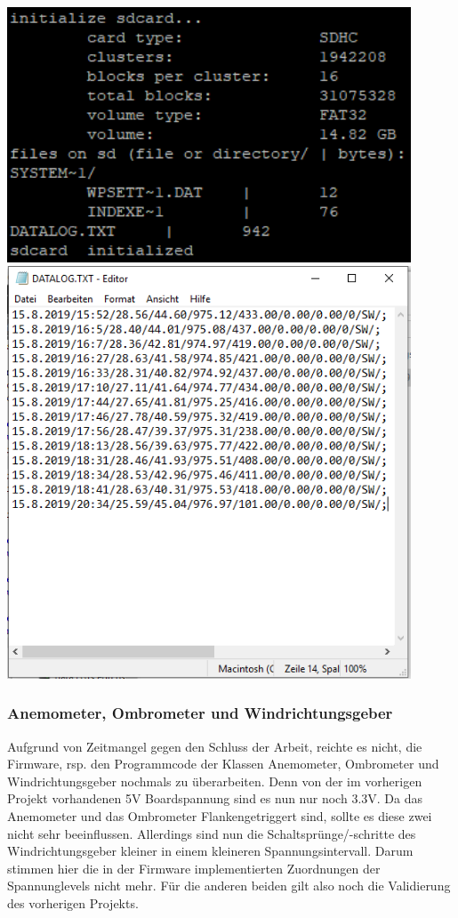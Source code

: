 \begin{minipage}[b][6.5cm][t]{0.4\textwidth}
\centering
\includegraphics[width=0.9\textwidth]{../../graphics/FW_val/init_sd.PNG}
\label{fig:validinitsd}
\centering
\includegraphics[width=0.9\textwidth]{../../graphics/FW_val/gespeicherteDaten.PNG} 
\label{fig:validsdcard}
\end{minipage}

\subsubsection{Anemometer, Ombrometer und Windrichtungsgeber}
\label{subsubsec:valaneombrowindr}
Aufgrund von Zeitmangel gegen den Schluss der Arbeit, reichte es nicht, die Firmware, rsp. den Programmcode der Klassen Anemometer, Ombrometer und Windrichtungsgeber nochmals zu überarbeiten. Denn von der im vorherigen Projekt vorhandenen 5V Boardspannung sind es nun nur noch 3.3V. Da das Anemometer und das Ombrometer Flankengetriggert sind, sollte es diese zwei nicht sehr beeinflussen. Allerdings sind nun die Schaltsprünge/-schritte des Windrichtungsgeber kleiner in einem kleineren Spannungsintervall. Darum stimmen hier die in der Firmware implementierten Zuordnungen der Spannunglevels nicht mehr. Für die anderen beiden gilt also noch die Validierung des vorherigen Projekts.\\


